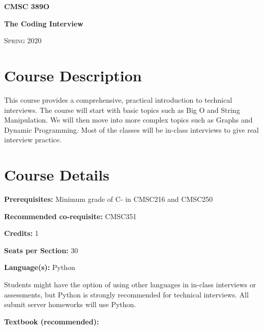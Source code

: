 \documentclass[12pt]{article}
\begin{document}
\thispagestyle{plain} %






\begin{center}
\bigskip
\large{\bf{CMSC 389O}}

\textbf{The Coding Interview}

\textsc{Spring 2020} \bigskip

\end{center}

\section*{Course Description}%
This course provides a comprehensive, practical introduction to technical interviews.
The course will start with basic topics such as Big O and String Manipulation.
We will then move into more complex topics such as Graphs and Dynamic Programming.
Most of the classes will be in-class interviews to give real interview practice.


\section*{Course Details}
\noindent\textbf{Prerequisites: }Minimum grade of C- in CMSC216 and CMSC250 \medskip

\noindent\textbf{Recommended co-requisite: }CMSC351 \medskip

\noindent\textbf{Credits: }1 \medskip

\noindent\textbf{Seats per Section: }30 \medskip

\noindent\textbf{Language(s): }Python

\noindent Students might have the option of using other languages in in-class interviews or assessments, but Python is strongly recommended for technical interviews. All submit server homeworks will use Python.
\medskip

\noindent\textbf{Textbook (recommended): }
\end{document}
